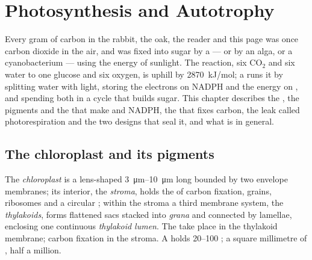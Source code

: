 \chapter{Photosynthesis and Autotrophy}\label{ch:b1:photosynthesis}

Every gram of carbon in the rabbit, the oak, the reader and this page
was once carbon dioxide in the air, and was fixed into sugar by a
 --- or by an alga, or a cyanobacterium --- using the energy of
sunlight. The reaction, six $\mathrm{CO_2}$ and six water to one
glucose and six oxygen, is uphill by \qty{2870}{kJ/mol}; a  runs
it by splitting water with light, storing the electrons on NADPH and
the energy on , and spending both in a cycle that builds sugar. This
chapter describes the , the pigments and the  that make  and NADPH, the  that fixes carbon,
the leak called photorespiration and the two designs that seal it, and
what  is in general.

\section{The chloroplast and its pigments}

\begin{definition}[Chloroplast]\label{def:b1:photosynthesis:chloroplast}
The \emph{chloroplast} is a lens-shaped 
\qtyrange{3}{10}{\micro m} long bounded by two envelope membranes; its
interior, the \emph{stroma}, holds the  of carbon
fixation,  grains, ribosomes and a circular ; within the
stroma a third membrane system, the \emph{thylakoids},
forms flattened sacs stacked into \emph{grana} and connected by
lamellae, enclosing one continuous \emph{thylakoid lumen}. The  take place in the thylakoid membrane; carbon fixation in the
stroma. A   holds \qtyrange{20}{100}{} ; a square
millimetre of , half a million.
\end{definition}

